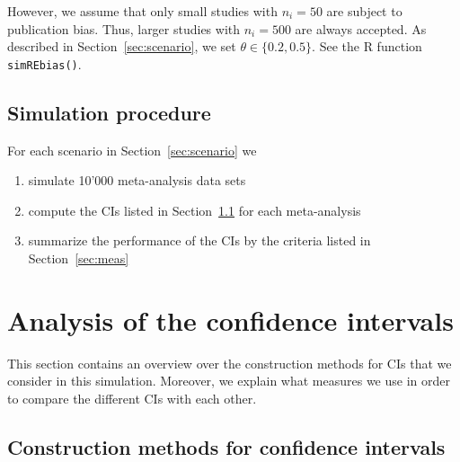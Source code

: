 \documentclass[letterpaper, 12pt]{article}
\begin{document}
However, we assume that only small studies with $n_i = 50$ are subject to
publication bias. Thus, larger studies with $n_i = 500$ are always accepted.
As described in Section~\ref{sec:scenario}, we set $\theta \in \{0.2, 0.5\}$.
See the R function \texttt{simREbias()}.



\subsection{Simulation procedure}
For each scenario in Section~\ref{sec:scenario} we
\begin{enumerate}
\item simulate 10'000 meta-analysis data sets
\item compute the CIs listed in Section~\ref{sec:method} for each meta-analysis
\item summarize the performance of the CIs by the criteria listed in
  Section~\ref{sec:meas}
\end{enumerate}

\section{Analysis of the confidence intervals} \label{sec:analysis}

This section contains an overview over the construction methods for CIs
that we consider in this simulation. Moreover, we explain what measures we
use in order to compare the different CIs with each other.

\subsection{Construction methods for confidence intervals} \label{sec:method}
\end{document}
